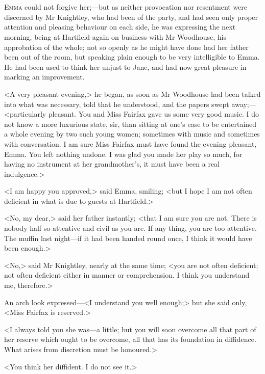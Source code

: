 \chapter[Chapter \thechapter]{}
\lettrine[lraise=0.3]{E}{mma} could not forgive her;—but as neither provocation nor resentment were discerned by Mr Knightley, who had been of the party, and had seen only proper attention and pleasing behaviour on each side, he was expressing the next morning, being at Hartfield again on business with Mr Woodhouse, his approbation of the whole; not so openly as he might have done had her father been out of the room, but speaking plain enough to be very intelligible to Emma. He had been used to think her unjust to Jane, and had now great pleasure in marking an improvement.

<A very pleasant evening,> he began, as soon as Mr Woodhouse had been talked into what was necessary, told that he understood, and the papers swept away;—<particularly pleasant. You and Miss Fairfax gave us some very good music. I do not know a more luxurious state, sir, than sitting at one's ease to be entertained a whole evening by two such young women; sometimes with music and sometimes with conversation. I am sure Miss Fairfax must have found the evening pleasant, Emma. You left nothing undone. I was glad you made her play so much, for having no instrument at her grandmother's, it must have been a real indulgence.>

<I am happy you approved,> said Emma, smiling; <but I hope I am not often deficient in what is due to guests at Hartfield.>

<No, my dear,> said her father instantly; <that I am sure you are not. There is nobody half so attentive and civil as you are. If any thing, you are too attentive. The muffin last night—if it had been handed round once, I think it would have been enough.>

<No,> said Mr Knightley, nearly at the same time; <you are not often deficient; not often deficient either in manner or comprehension. I think you understand me, therefore.>

An arch look expressed—<I understand you well enough;> but she said only, <Miss Fairfax is reserved.>

<I always told you she was—a little; but you will soon overcome all that part of her reserve which ought to be overcome, all that has its foundation in diffidence. What arises from discretion must be honoured.>

<You think her diffident. I do not see it.>

